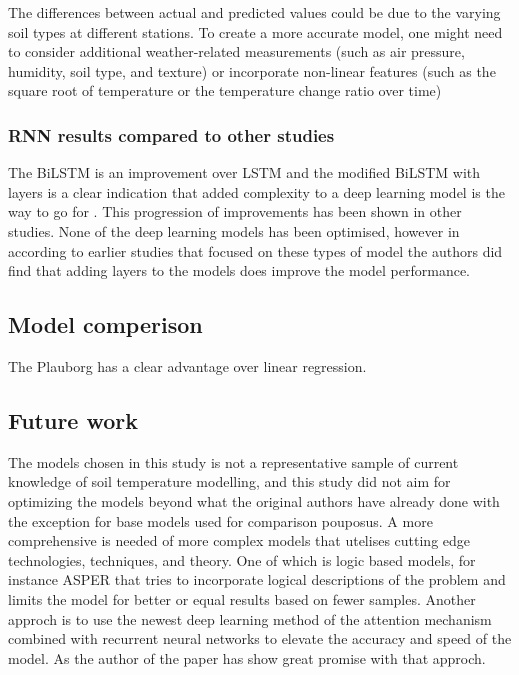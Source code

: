 The differences between actual and predicted values could be due to the varying soil types at different stations. To create a more accurate model, one might need to consider additional weather-related measurements (such as air pressure, humidity, soil type, and texture) or incorporate non-linear features (such as the square root of temperature or the temperature change ratio over time)
 
\subsubsection{RNN results compared to other studies}
 
The BiLSTM is an improvement over LSTM and the modified BiLSTM with layers is a clear indication that added complexity to a deep learning model is the way to go for . This progression of improvements has been shown in other studies\cite{feng_estimation_2019,citakoglu_comparison_2017,li_attention-aware_2022,li_gans-lstm_2020,wang_modeling_2022}. None of the deep learning models has been optimised, however in according to earlier studies that focused on these types of model the authors did find that adding layers to the models does improve the model performance. 

\subsection{Model comperison}

The Plauborg has a clear advantage over linear regression.

\subsection{Future work}

The models chosen in this study is not a representative sample of current knowledge of soil temperature modelling, and this study did not aim for optimizing the models beyond what the original authors have already done with the exception for base models used for comparison pouposus. A more comprehensive is needed of more complex models that utelises cutting edge technologies, techniques, and theory. One of which is logic based models, for instance ASPER\cite{le_asper_2023} that tries to incorporate logical descriptions of the problem and limits the model for better or equal results based on fewer samples\cite{machot_bridging_2023}. Another approch is to use the newest deep learning method of the attention mechanism\cite{vaswani_attention_2017} combined with recurrent neural networks to elevate the accuracy and speed of the model. As the author of the paper \cite{li_attention-aware_2022} has show great promise with that approch.

